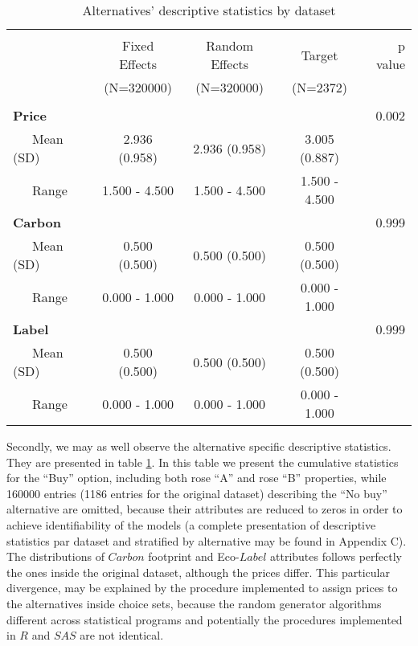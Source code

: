 \documentclass[11pt,]{article}
\begin{document}
\begin{table}[!htbp] \centering 
  \caption{Alternatives' descriptive statistics by dataset} 
  \label{tab:alt1} 
\begin{tabular}{@{\extracolsep{5pt}}lcccr}
\\[-1.8ex]\hline 
\hline \\[-1.8ex] 
 & Fixed Effects  & Random Effects  & Target  & p value\\
 & (N=320000) & (N=320000) & (N=2372) &  \\
\hline \\[-1.8ex] 
\textbf{Price} &  &  &  & 0.002\\
~~~Mean (SD) & 2.936 (0.958) & 2.936 (0.958) & 3.005 (0.887) & \\
~~~Range & 1.500 - 4.500 & 1.500 - 4.500 & 1.500 - 4.500 & \\
\textbf{Carbon} &  &  &  & 0.999\\
~~~Mean (SD) & 0.500 (0.500) & 0.500 (0.500) & 0.500 (0.500) & \\
~~~Range & 0.000 - 1.000 & 0.000 - 1.000 & 0.000 - 1.000 & \\
\textbf{Label} &  &  &  & 0.999\\
~~~Mean (SD) & 0.500 (0.500) & 0.500 (0.500) & 0.500 (0.500) & \\
~~~Range & 0.000 - 1.000 & 0.000 - 1.000 & 0.000 - 1.000 & \\
\hline
\end{tabular}
\end{table}

Secondly, we may as well observe the alternative specific descriptive
statistics. They are presented in table \ref{tab:alt1}. In this table we
present the cumulative statistics for the ``Buy'' option, including both
rose ``A'' and rose ``B'' properties, while 160000 entries (1186 entries
for the original dataset) describing the ``No buy'' alternative are
omitted, because their attributes are reduced to zeros in order to
achieve identifiability of the models (a complete presentation of
descriptive statistics par dataset and stratified by alternative may be
found in Appendix C). The distributions of \(Carbon\) footprint and
Eco-\(Label\) attributes follows perfectly the ones inside the original
dataset, although the prices differ. This particular divergence, may be
explained by the procedure implemented to assign prices to the
alternatives inside choice sets, because the random generator algorithms
different across statistical programs and potentially the procedures
implemented in \(R\) and \(SAS\) are not identical.
\end{document}
